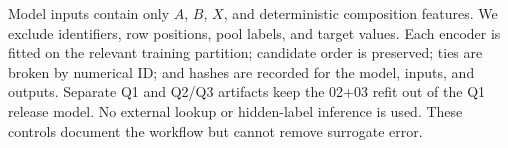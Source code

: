 Model inputs contain only $A$, $B$, $X$, and deterministic composition
features.  We exclude identifiers, row positions, pool labels, and target
values.  Each encoder is fitted on the relevant training partition;
candidate order is preserved; ties are broken by numerical ID; and hashes
are recorded for the model, inputs, and outputs.  Separate Q1 and Q2/Q3
artifacts keep the 02+03 refit out of the Q1 release model.  No external
lookup or hidden-label inference is used.  These controls document the
workflow but cannot remove surrogate error.
